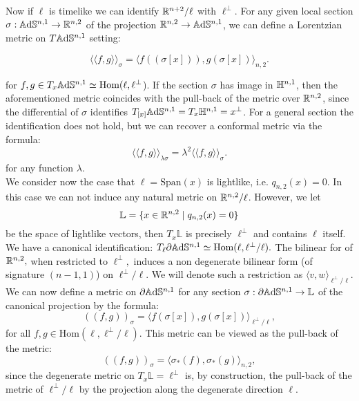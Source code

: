 Now if $\ell$ is timelike we can identify $\mathbb{R}^{n+2}/\ell$ with $\ell^{\perp}.$ For any given local section $\sigma:\mathbb{A}\mathrm{d}\mathbb{S}^{n,1}\to \mathbb{R}^{n,2}$ of the projection $\mathbb{R}^{n,2}\to \mathbb{A}\mathrm{d}\mathbb{S}^{n,1}$, we can define a Lorentzian metric on $T\mathbb{A}\mathrm{d}\mathbb{S}^{n,1}$ setting:

\[
    \langle \langle f,g \rangle \rangle_{\sigma}=\langle f((\sigma[x])),g(\sigma[x])\rangle_{n,2}. 
\]

for $f,g\in T_{x}\mathbb{A}\mathrm{d}\mathbb{S}^{n,1}\simeq \text{Hom}(\ell,\ell^\perp$). If the section $\sigma$ has image in $\mathbb{H}^{n,1}$, then the aforementioned metric coincides with the pull-back of the metric over $\mathbb{R}^{n,2}$, since the differential of $\sigma $ identifies $T_{[x]}\mathbb{A}\mathrm{d}\mathbb{S}^{n,1}=T_x\mathbb{H}^{n,1}=x^\perp$. For a general section the identification does not hold, but we can recover a conformal metric via the formula: 
\[
    \langle \langle f,g \rangle \rangle_{\lambda\sigma}=\lambda^2\langle \langle f,g \rangle \rangle_{\sigma}.
\] for any function $\lambda$.\\
We consider now the case that $\ell=\text{Span}(x)$ is lightlike, i.e. $q_{n,2}(x)=0$. In this case we can not induce any natural metric on $\mathbb{R}^{n,2}/\ell$. However, we let 
\[
    \mathbb{L}=\{x\in \mathbb{R}^{n,2}\;|\;q_{n,2}(x)=0\}
\]
be the space of lightlike vectors, then $T_x\mathbb{L}$ is precisely $\ell^{\perp}$ and contains $\ell$ itself. We have a canonical identification: $T_\ell\partial\mathbb{A}\mathrm{d}\mathbb{S}^{n,1}\simeq\text{Hom}(\ell,\ell^{\perp }/\ell).$ The bilinear for of $\mathbb{R}^{n,2},$ when restricted to $\ell^{\perp},$ induces a non degenerate bilinear form (of signature $(n-1,1)$) on $\ell^\perp/\ell.$ We will denote such a restriction as $\langle v,w\rangle_{\ell^{\perp}/\ell}.$ \\
We can now define a metric on $\partial\mathbb{A}\mathrm{d}\mathbb{S}^{n,1}$ for any section $\sigma:\partial\mathbb{A}\mathrm{d}\mathbb{S}^{n,1}\to \mathbb{L}$ of the canonical projection by the formula:
\begin{equation}\label{24}
    ((f,g))_{\sigma}=\langle f(\sigma[x]),g(\sigma[x])\rangle_{\ell^{\perp}/\ell},
\end{equation}
for all $f,g\in \text{Hom}(\ell, \ell^\perp/\ell).$ This metric can be viewed as the pull-back of the metric: 
\begin{equation}\label{25}
    ((f,g))_\sigma=\langle \sigma_*(f), \sigma_{\ast} (g)\rangle_{n,2}, 
\end{equation}
since the degenerate metric on $T_x\mathbb{L}=\ell^\perp$ is, by construction, the pull-back of the metric of $\ell^{\perp}/\ell$ by the projection along the degenerate direction $\ell$.\\ 

